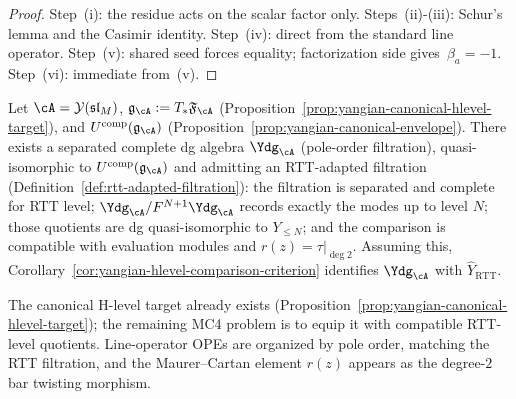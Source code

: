 \begin{proof}
Step~\textup{(i)}: the residue acts on the scalar factor only.
Steps~\textup{(ii)}-\textup{(iii)}: Schur's lemma and the Casimir
identity.
Step~\textup{(iv)}: direct from the standard line operator.
Step~\textup{(v)}: shared seed forces equality; factorization side
gives~$\beta_a=-1$.
Step~\textup{(vi)}: immediate from~\textup{(v)}.
\end{proof}

\begin{conjecture}
\label{conj:dg-shifted-yangian-rtt-package}
Let $\cA=\mathcal{Y}(\mathfrak{sl}_M)$,
$\mathfrak{g}_{\cA}:=T_*\mathfrak{F}_{\cA}$
(Proposition~\ref{prop:yangian-canonical-hlevel-target}), and
$U^{\mathrm{comp}}(\mathfrak{g}_{\cA})$
(Proposition~\ref{prop:yangian-canonical-envelope}). There exists a
separated complete dg algebra $\Ydg_{\cA}$ (pole-order filtration),
quasi-isomorphic to $U^{\mathrm{comp}}(\mathfrak{g}_{\cA})$ and
admitting an RTT-adapted filtration
(Definition~\ref{def:rtt-adapted-filtration}): the filtration is
separated and complete for RTT level;
$\Ydg_{\cA}/F^{N+1}\Ydg_{\cA}$ records exactly the modes up to level
$N$; those quotients are dg quasi-isomorphic to $Y_{\le N}$; and the
comparison is compatible with evaluation modules and
$r(z)=\tau|_{\deg 2}$. Assuming this,
Corollary~\ref{cor:yangian-hlevel-comparison-criterion} identifies
$\Ydg_{\cA}$ with $\widehat Y_{\mathrm{RTT}}$.
\end{conjecture}

\begin{remark}
\label{rem:dg-shifted-filtration-route}
The canonical H-level target already exists (Proposition~\ref{prop:yangian-canonical-hlevel-target}); the remaining MC4 problem is to equip it with compatible RTT-level quotients. Line-operator OPEs are organized by pole order, matching the RTT filtration, and the Maurer--Cartan element $r(z)$ appears as the degree-$2$ bar twisting morphism.
\end{remark}

